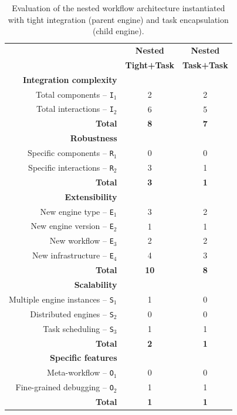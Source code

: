 \documentclass[preprint,3p,twocolumn]{elsarticle}
\newcommand{\correction}[1]{\color{blue}#1\color{black}\xspace}
\begin{document}
\begin{table}
\footnotesize
\centering
\begin{tabular}{rcc}
                                     & \textbf{Nested} & \textbf{Nested}\\
                                     & \textbf{Tight+Task} & \textbf{Task+Task}\\
\cellcolor[HTML]{EEEEEE}\textbf{Integration complexity}&\cellcolor[HTML]{EEEEEE}&\cellcolor[HTML]{EEEEEE}\\
  Total components -- \texttt{I$_1$} & 2 & 2 \\
Total interactions -- \texttt{I$_2$} & 6 & 5 \\
\textbf{Total}& \textbf{8} & \textbf{7}\\
\cellcolor[HTML]{EEEEEE}\textbf{Robustness}&\cellcolor[HTML]{EEEEEE}&\cellcolor[HTML]{EEEEEE}\\
Specific components -- \texttt{R$_1$} & 0 & 0\\
  Specific interactions -- \texttt{R$_2$} & 3 & 1\\
  \textbf{Total}& \textbf{3} & \textbf{1}\\
\cellcolor[HTML]{EEEEEE}\textbf{Extensibility}&\cellcolor[HTML]{EEEEEE}&\cellcolor[HTML]{EEEEEE}\\
  New engine type -- \texttt{E$_1$}  & 3 & 2\\
New engine version -- \texttt{E$_2$} & 1 & 1\\
  New workflow -- \texttt{E$_3$}     & 2 & 2\\
New infrastructure -- \texttt{E$_4$} & 4 & 3\\
  \textbf{Total}& \textbf{10} & \textbf{8}\\
\cellcolor[HTML]{EEEEEE}\textbf{Scalability}& \cellcolor[HTML]{EEEEEE}&\cellcolor[HTML]{EEEEEE}\\
Multiple engine instances -- \texttt{S$_1$}& 1 & 0\\
Distributed engines -- \texttt{S$_2$}& 0 & 0\\
Task scheduling -- \texttt{S$_3$}    & 1 & 1\\
\textbf{Total}& \textbf{2} & \textbf{1}\\
\cellcolor[HTML]{EEEEEE}\textbf{Specific features}&\cellcolor[HTML]{EEEEEE}&\cellcolor[HTML]{EEEEEE}\\
  Meta-workflow  -- \texttt{O$_1$}    & 0 & 0\\
  Fine-grained debugging -- \texttt{O$_2$}  & 1 & 1\\
  \textbf{Total}& \textbf{1} & \textbf{1}\\
\end{tabular}
\caption{\correction{Evaluation of the nested workflow architecture instantiated with tight integration (parent engine) and task encapsulation (child engine).}}
\label{table:evaluation-2}
\end{table}
\end{document}
